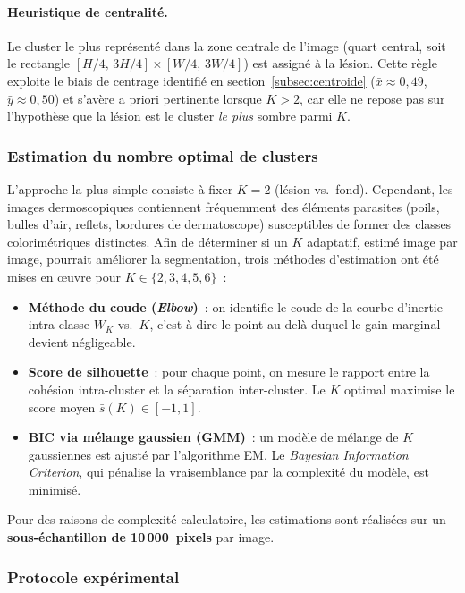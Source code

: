 \documentclass[12pt,a4paper]{article}
\begin{document}
\paragraph{Heuristique de centralité.} Le cluster le plus représenté dans la zone centrale de l'image (quart central, soit le rectangle $[H/4,\, 3H/4] \times [W/4,\, 3W/4]$) est assigné à la lésion. Cette règle exploite le biais de centrage identifié en section~\ref{subsec:centroide} ($\bar{x} \approx 0{,}49$, $\bar{y} \approx 0{,}50$) et s'avère a priori pertinente lorsque $K > 2$, car elle ne repose pas sur l'hypothèse que la lésion est le cluster \emph{le plus} sombre parmi $K$.

\subsubsection{Estimation du nombre optimal de clusters}
\label{subsubsec:estimation_k}

L'approche la plus simple consiste à fixer $K = 2$ (lésion vs.\ fond). Cependant, les images dermoscopiques contiennent fréquemment des éléments parasites (poils, bulles d'air, reflets, bordures de dermatoscope) susceptibles de former des classes colorimétriques distinctes. Afin de déterminer si un $K$ adaptatif, estimé image par image, pourrait améliorer la segmentation, trois méthodes d'estimation ont été mises en \oe uvre pour $K \in \{2, 3, 4, 5, 6\}$~:

\begin{itemize}[nosep]
    \item \textbf{Méthode du coude (\emph{Elbow})}~: on identifie le \og coude \fg{} de la courbe d'inertie intra-classe $W_K$ vs.\ $K$, c'est-à-dire le point au-delà duquel le gain marginal devient négligeable.
    \item \textbf{Score de silhouette}~: pour chaque point, on mesure le rapport entre la cohésion intra-cluster et la séparation inter-cluster. Le $K$ optimal maximise le score moyen $\bar{s}(K) \in [-1, 1]$.
    \item \textbf{BIC via mélange gaussien (GMM)}~: un modèle de mélange de $K$ gaussiennes est ajusté par l'algorithme EM. Le \emph{Bayesian Information Criterion}, qui pénalise la vraisemblance par la complexité du modèle, est minimisé.
\end{itemize}

Pour des raisons de complexité calculatoire, les estimations sont réalisées sur un \textbf{sous-échantillon de 10\,000~pixels} par image.

\subsubsection{Protocole expérimental}
\label{subsubsec:protocole_kmeans}
\end{document}

